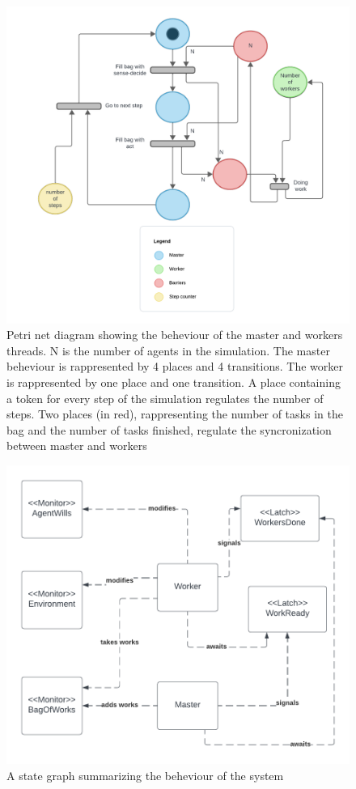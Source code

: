 \documentclass[12pt, a4paper]{report}
\begin{document}
\begin{figure}
    \centering
    \includegraphics{PetriNetColored.png}
    \caption{Petri net diagram showing the beheviour of the master and workers threads. N is the number of agents in the simulation. The master beheviour is rappresented by 4 places and 4 transitions. The worker is rappresented by one place and one transition. A place containing a token for every step of the simulation regulates the number of steps. Two places (in red), rappresenting the number of tasks in the bag and the number of tasks finished, regulate the syncronization between master and workers}
\end{figure}

\begin{figure}
    \centering
    \includegraphics{UML1.png}
    \caption{A state graph summarizing the beheviour of the system}
\end{figure}
\end{document}
